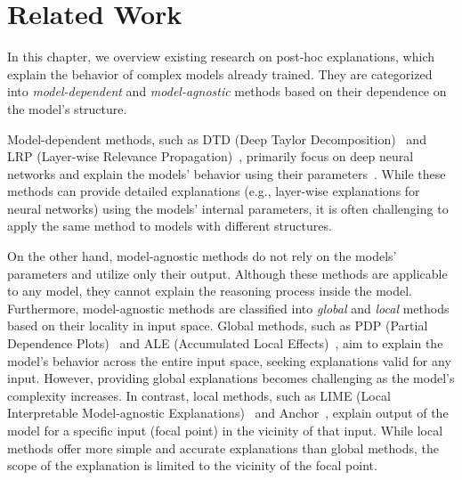 \documentclass[11pt]{article}
\begin{document}
\section{Related Work}
In this chapter,
we overview existing research on post-hoc explanations,
which explain the behavior of complex models already trained.
They are categorized
into \emph{model-dependent} and \emph{model-agnostic} methods
based on their dependence on the model's structure.

Model-dependent methods,
such as DTD (Deep Taylor Decomposition)~\cite{montavon2017explaining}
and LRP (Layer-wise Relevance Propagation)~\cite{bach2015pixel},
primarily focus on deep neural networks and
explain the models' behavior using their parameters~\cite{samek2021explaining}.
While these methods can provide detailed explanations
(e.g., layer-wise explanations for neural networks)
using the models' internal parameters,
it is often challenging
to apply the same method to models with different structures.

On the other hand,
model-agnostic methods
do not rely on the models' parameters and utilize only their output.
Although these methods are applicable to any model,
they cannot explain the reasoning process inside the model.
Furthermore, model-agnostic methods are classified into
\emph{global} and \emph{local} methods based on their locality in input space.
Global methods,
such as PDP (Partial Dependence Plots)~\cite{friedman2001greedy}
and ALE (Accumulated Local Effects)~\cite{apley2020visualizing},
aim to explain the model's behavior across the entire input space,
seeking explanations valid for any input.
However, providing global explanations becomes challenging
as the model's complexity increases.
In contrast, local methods,
such as LIME (Local Interpretable Model-agnostic Explanations)~\cite{ribeiro2016why}
and Anchor~\cite{ribeiro2018anchors},
explain output of the model for a specific input
(focal point) in the vicinity of that input.
While local methods offer more simple and accurate explanations
than global methods,
the scope of the explanation is limited to the vicinity of the focal point.
\end{document}
